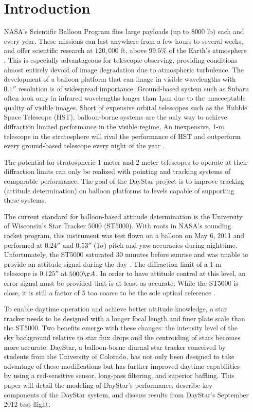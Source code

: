\documentclass[twocolumn,letterpaper]{IEEEAerospace2012}
\begin{document}
\section{Introduction}
NASA's Scientific Balloon Program flies large payloads (up to 8000 lb) each and every year. These missions can last anywhere from a few hours to several weeks, and offer scientific research at $120,000$ ft, above $99.5\%$ of the Earth's atmosphere \cite{young2012}. This is especially advantageous for telescopic observing, providing conditions almost entirely devoid of image degradation due to atmospheric turbulence. The development of a balloon platform that can image in visible wavelengths with $0.1''$ resolution is of widespread importance. Ground-based system such as Subaru often look only in infrared wavelengths longer than $1 \mu$m due to the unacceptable quality of visible images. Short of expensive orbital telescopes such as the Hubble Space Telescope (HST), balloon-borne systems are the only way to achieve diffraction limited performance in the visible regime. An inexpensive, 1-m telescope in the stratosphere will rival the performance of HST and outperform every ground-based telescope every night of
the year \cite{young2012}.

The potential for stratospheric 1 meter and 2 meter telescopes to operate at their diffraction limits can only be realized with pointing and tracking systems of comparable performance. The goal of the DayStar project is to improve tracking (attitude determination) on balloon platforms to levels capable of supporting these systems.

The current standard for balloon-based attitude determination is the University of Wisconsin's Star Tracker 5000 (ST5000). With roots in NASA's sounding rocket program, this instrument was test flown on a balloon on May 6, 2011 and performed at $0.24''$ and $0.53''$ ($1\sigma$) pitch and yaw accuracies during nighttime. Unfortunately, the ST5000 saturated 30 minutes before sunrise and was unable to provide an attitude signal during the day \cite{young2012}. The diffraction limit of a 1-m telescope is $0.125''$ at $5000 \AA{}$. In order to have attitude control at this level, an error signal must be provided that is at least as accurate. While the ST5000 is close, it is still a factor of 5 too coarse to be the sole optical reference \cite{young2012}.

To enable daytime operation and achieve better attitude knowledge, a star tracker needs to be designed with a longer focal length and finer plate scale than the ST5000. Two benefits emerge with these changes: the intensity level of the sky background relative to star flux drops and the centroiding of stars becomes more accurate. DayStar, a balloon-borne diurnal star tracker conceived by students from the University of Colorado, has not only been designed to take advantage of these modifications but has further improved daytime capabilities by using a red-sensitive sensor, long-pass filtering, and superior baffling. This paper will detail the modeling of DayStar's performance, describe key components of the DayStar system, and discuss results from DayStar's September 2012 test flight.
\end{document}
